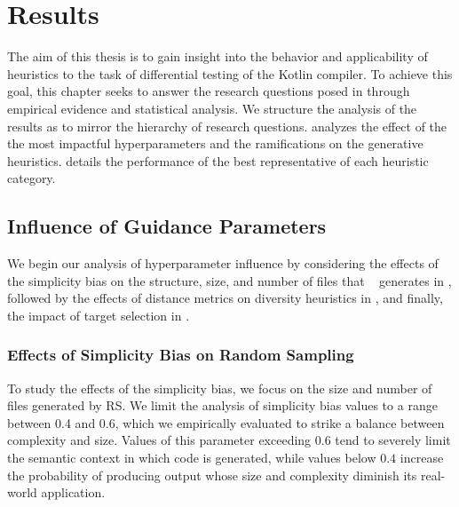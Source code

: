 \chapter{\label{cha:results}Results}

The aim of this thesis is to gain insight into the behavior and applicability
of heuristics to the task of differential testing of the Kotlin compiler.
To achieve this goal, this chapter seeks to answer the research questions posed in
 through empirical evidence and statistical analysis.
We structure the analysis of the results as to mirror the hierarchy
of research questions.
 analyzes the effect of the the most impactful
hyperparameters and the ramifications on the generative heuristics.
 details the performance of the best representative
of each heuristic category.

\section{\label{sec:resrq1}Influence of Guidance Parameters}

We begin our analysis of hyperparameter influence by considering the effects of
the simplicity bias on the structure, size, and number of files that \kf~ generates
in , followed by the effects of distance metrics on diversity
heuristics in , and finally, the impact 
of target selection in .

\subsection{\label{subsec:simpl_bias}Effects of Simplicity Bias on Random Sampling}

To study the effects of the simplicity bias, we focus on the size and number of files
generated by \gls{RS}.
We limit the analysis of simplicity bias values to a range between 0.4 and 0.6,
which we empirically evaluated to strike a balance between complexity and size.
Values of this parameter exceeding $0.6$ tend to severely
limit the semantic context in which code is generated,
while values below $0.4$ increase the probability of producing
output whose size and complexity diminish its real-world application.

